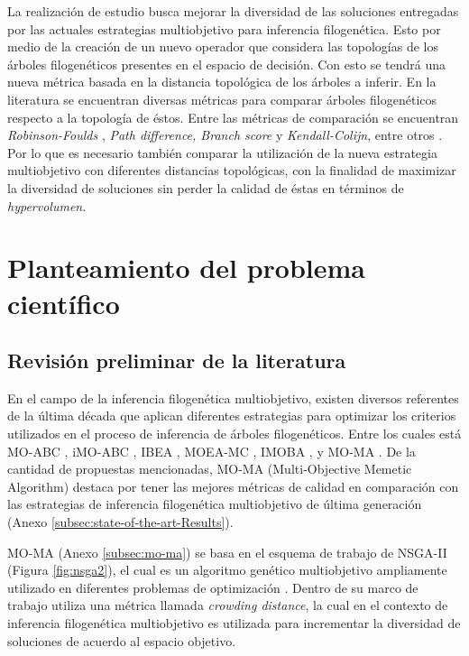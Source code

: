 La realización de estudio busca mejorar la diversidad de las soluciones entregadas por las actuales estrategias multiobjetivo para inferencia filogenética. Esto por medio de la creación de un nuevo operador que considera las topologías de los árboles filogenéticos presentes en el espacio de decisión. Con esto se tendrá una nueva métrica basada en la distancia topológica de los árboles a inferir. En la literatura se encuentran diversas métricas para comparar árboles filogenéticos respecto a la topología de éstos. Entre las métricas de comparación se encuentran \textit{Robinson-Foulds} \citep{Briand2020}, \textit{Path difference, Branch score} y \textit{Kendall-Colijn}, entre otros \citep{Jombart2017}. Por lo que es necesario también comparar la utilización de la nueva estrategia multiobjetivo con diferentes distancias topológicas, con la finalidad de maximizar la diversidad de soluciones sin perder la calidad de éstas en términos de \textit{hypervolumen}.


\section{Planteamiento del problema científico}
\label{cap:problemStatement}

\subsection{Revisión preliminar de la literatura}
\label{sec:preliminarLiteratureReview}

En el campo de la inferencia filogenética multiobjetivo, existen diversos referentes de la última década que aplican diferentes estrategias para optimizar los criterios utilizados en el proceso de inferencia de árboles filogenéticos. Entre los cuales está MO-ABC \citep{Santander-Jimenez2013}, iMO-ABC \citep{Santander-Jimenez2012}, IBEA \citep{Santander-Jimenez2016b}, MOEA-MC \citep{Zhang2020}, IMOBA \citep{Santander-Jimenez2016b,Arco2020}, y MO-MA \cite{VillalobosCid2019}. De la cantidad de propuestas mencionadas, MO-MA (Multi-Objective Memetic Algorithm) destaca por tener las mejores métricas de calidad en comparación con las estrategias de inferencia filogenética multiobjetivo de última generación (Anexo \ref{subsec:state-of-the-art-Results}).

MO-MA (Anexo \ref{subsec:mo-ma}) se basa en el esquema de trabajo de NSGA-II (Figura \ref{fig:nsga2}), el cual es un algoritmo genético multiobjetivo ampliamente utilizado en diferentes problemas de optimización \citep{Correa2008}. Dentro de su marco de trabajo utiliza una métrica llamada \textit{crowding distance}, la cual en el contexto de inferencia filogenética multiobjetivo es utilizada para incrementar la diversidad de soluciones de acuerdo al espacio objetivo.

